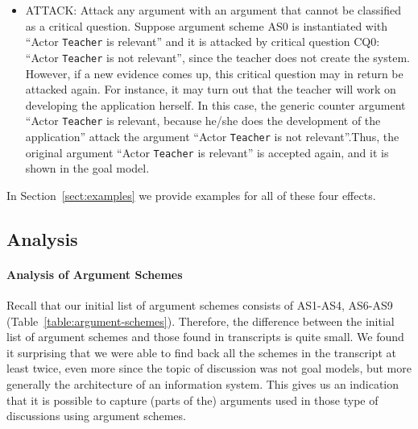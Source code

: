 \begin{itemize}
\item \textsf{ATTACK:} Attack any argument with an argument that cannot be classified as a critical question. Suppose argument scheme AS0 is instantiated with ``Actor \texttt{Teacher} is relevant'' and it is attacked by critical question CQ0: ``Actor \texttt{Teacher} is not relevant'', since the teacher does not create the system. However,  if a new evidence comes up, this critical question may in return be attacked again. For instance, it may turn out that the teacher will work on developing the application herself.  In this case, the generic counter argument ``Actor \texttt{Teacher} is relevant, because he/she does the development of the application'' attack the argument ``Actor \texttt{Teacher} is not relevant''.Thus, the original argument ``Actor \texttt{Teacher} is relevant'' is accepted again, and it is shown in the goal model.
\end{itemize}

In Section~\ref{sect:examples} we provide examples for all of these four effects.

\subsection{Analysis}
\label{sect:gmas:transcripts:analysis}

\paragraph{Analysis of Argument Schemes}
Recall that our initial list of argument schemes consists of AS1-AS4, AS6-AS9 (Table~\ref{table:argument-schemes}). Therefore, the difference between the initial list of argument schemes and those found in transcripts is quite small. 
We found it surprising that we were able to find back all the schemes in the transcript at least twice, even more since the topic of discussion was not goal models, but more generally the architecture of an information system. This gives us an indication that it is possible to capture (parts of the) arguments used in those type of discussions using argument schemes.

